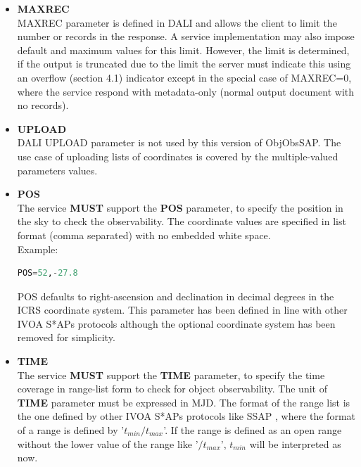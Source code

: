 \documentclass[11pt,a4paper]{ivoatex/ivoa}
\begin{document}
\begin{itemize}
\item{\textbf{MAXREC}\\MAXREC parameter is defined in DALI and allows
the client to limit the number or records in the response. A service
implementation may also impose default and maximum values for this limit.
However, the limit is determined, if the output is truncated due to the
limit the server must indicate this using an overflow (section 4.1)
indicator except in the special case of MAXREC=0, where the service
respond with metadata-only (normal output document with no records).}

\item{\textbf{UPLOAD}\\DALI UPLOAD parameter is not used by this version
of ObjObsSAP. The use case of uploading lists of coordinates is covered
by the multiple-valued parameters values.}

\item{\textbf{POS}\\The service \textbf{MUST }support the
\textbf{POS} parameter, to specify the position in the sky to check the observability. 
The coordinate values are specified in list format (comma separated) with no embedded white
space.\\
Example:\\
\begin{lstlisting}[language=SQL]
POS=52,-27.8
\end{lstlisting}
\par
POS defaults to right-ascension and declination in decimal degrees in
the ICRS coordinate system. This parameter has been defined in line with
other IVOA S*APs protocols although the optional coordinate system has
been removed for simplicity.}

\item{\textbf{TIME}\\The service \textbf{MUST} support the
\textbf{TIME} parameter, to specify the time coverage in range-list form
to check for object observability. The unit of \textbf{TIME} parameter must be
expressed in MJD. The format of the range list is the one defined by other
IVOA S*APs protocols like SSAP \citep{std:SSAP}, where the format of a
range is defined by '$t_{min}\slash t_{max}$'. If the range is defined
as an open range without the lower value of the range like '$\slash t_{max}$',
$t_{min}$ will be interpreted as now.\\

}
\end{itemize}
\end{document}
